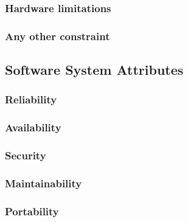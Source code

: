 \subsubsection{Hardware limitations}

\subsubsection{Any other constraint}


\subsection{Software System Attributes}

\subsubsection{Reliability}

\subsubsection{Availability}

\subsubsection{Security}

\subsubsection{Maintainability}

\subsubsection{Portability}
